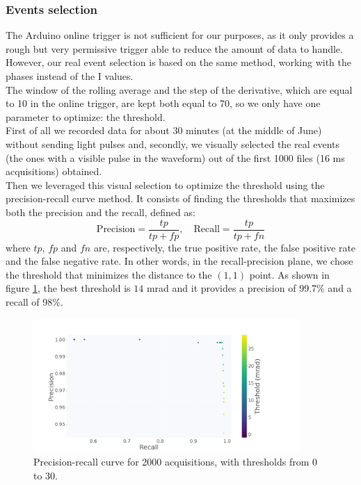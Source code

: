 \documentclass[12pt]{article}
\begin{document}
\subsubsection{Events selection}
The Arduino online trigger is not sufficient for our purposes, as it only provides a rough but very permissive trigger able to reduce the amount of data to handle.\\
However, our real event selection is based on the same method, working with the phases instead of the I values.\\The window of the rolling average and the step of the derivative, which are equal to 10 in the online trigger, are kept both equal to 70, so we only have one parameter to optimize: the threshold.\\
First of all we recorded data for about 30 minutes (at the middle of June) without sending light pulses and, secondly, we visually selected the real events (the ones with a visible pulse in the waveform) out of the first 1000 files (16 ms acquisitions) obtained.\\
Then we leveraged this visual selection to optimize the threshold using the precision-recall curve method. It consists of finding the thresholds that maximizes both the precision and the recall, defined as:
\begin{equation}
\text{Precision}={\frac {tp}{tp+fp}},\quad \text{Recall}={\frac {tp}{tp+fn}}
\end{equation}
where $tp$, $fp$ and $fn$ are, respectively, the true positive rate, the false positive rate and the false negative rate. In other words, in the recall-precision plane, we chose the threshold that minimizes the distance to the $(1, 1)$ point. As shown in figure \ref{fig: Prec}, the best threshold is $14$ mrad and it provides a precision of 99.7\% and a recall of 98\%.
\begin{figure}[H]
\centering
\includegraphics[width=0.9\textwidth]{prec-rec.png}
\caption{\label{fig: Prec}Precision-recall curve for 2000 acquisitions, with thresholds from 0 to 30.}
\end{figure}
\end{document}
